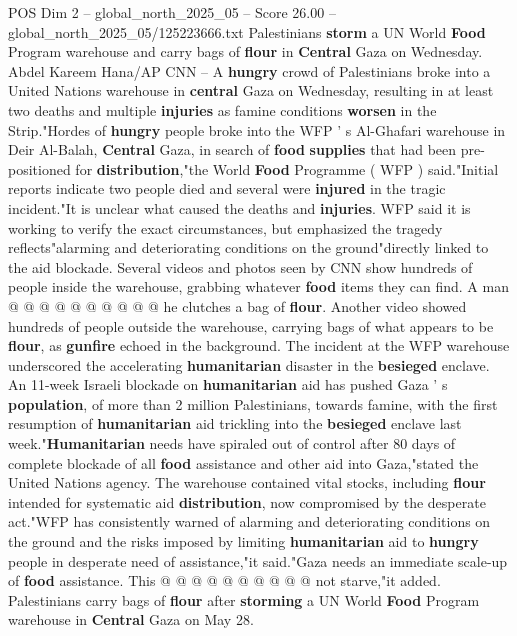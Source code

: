 \begin{textsample}{POS Dim 2 – global\_north\_2025\_05 – Score 26.00 – global\_north\_2025\_05/125223666.txt}  \label{ex:f2_pos_218}
Palestinians \textbf{storm} a UN World \textbf{Food} Program warehouse and carry bags of \textbf{flour} in \textbf{Central} Gaza on Wednesday.
Abdel Kareem Hana/AP CNN -- A \textbf{hungry} crowd of Palestinians broke into a United Nations warehouse in \textbf{central} Gaza on Wednesday, resulting in at least two deaths and multiple \textbf{injuries} as famine conditions \textbf{worsen} in the Strip."Hordes of \textbf{hungry} people broke into the WFP ' s Al-Ghafari warehouse in Deir Al-Balah, \textbf{Central} Gaza, in search of \textbf{food} \textbf{supplies} that had been pre-positioned for \textbf{distribution},"the World \textbf{Food} Programme ( WFP ) said."Initial reports indicate two people died and several were \textbf{injured} in the tragic incident."It is unclear what caused the deaths and \textbf{injuries}.
WFP said it is working to verify the exact circumstances, but emphasized the tragedy reflects"alarming and deteriorating conditions on the ground"directly linked to the aid blockade.
Several videos and photos seen by CNN show hundreds of people inside the warehouse, grabbing whatever \textbf{food} items they can find.
A man @ @ @ @ @ @ @ @ @ @ he clutches a bag of \textbf{flour}.
Another video showed hundreds of people outside the warehouse, carrying bags of what appears to be \textbf{flour}, as \textbf{gunfire} echoed in the background.
The incident at the WFP warehouse underscored the accelerating \textbf{humanitarian} disaster in the \textbf{besieged} enclave.
An 11-week Israeli blockade on \textbf{humanitarian} aid has pushed Gaza ' s \textbf{population}, of more than 2 million Palestinians, towards famine, with the first resumption of \textbf{humanitarian} aid trickling into the \textbf{besieged} enclave last week."\textbf{Humanitarian} needs have spiraled out of control after 80 days of complete blockade of all \textbf{food} assistance and other aid into Gaza,"stated the United Nations agency.
The warehouse contained vital stocks, including \textbf{flour} intended for systematic aid \textbf{distribution}, now compromised by the desperate act."WFP has consistently warned of alarming and deteriorating conditions on the ground and the risks imposed by limiting \textbf{humanitarian} aid to \textbf{hungry} people in desperate need of assistance,"it said."Gaza needs an immediate scale-up of \textbf{food} assistance.
This @ @ @ @ @ @ @ @ @ @ not starve,"it added.
Palestinians carry bags of \textbf{flour} after \textbf{storming} a UN World \textbf{Food} Program warehouse in \textbf{Central} Gaza on May 28.

\end{textsample}
